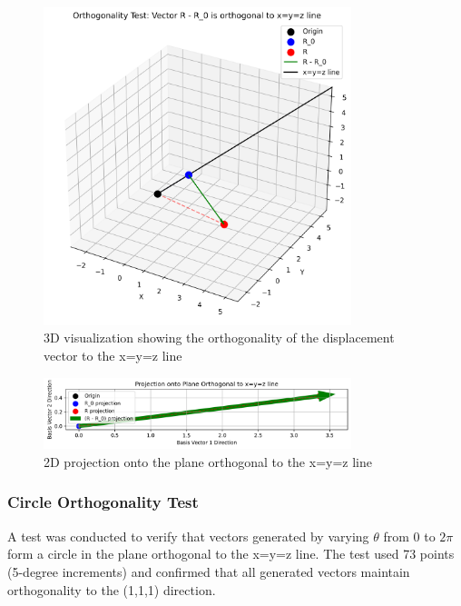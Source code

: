 \begin{figure}[H]
    \centering
    \includegraphics[width=0.8\textwidth]{figures/orthogonality_test/orthogonality_test_3d.png}
    \caption{3D visualization showing the orthogonality of the displacement vector to the x=y=z line}
    \label{fig:orthogonality_test_3d}
\end{figure}

\begin{figure}[H]
    \centering
    \includegraphics[width=0.8\textwidth]{figures/orthogonality_test/orthogonality_test_2d.png}
    \caption{2D projection onto the plane orthogonal to the x=y=z line}
    \label{fig:orthogonality_test_2d}
\end{figure}

\subsubsection{Circle Orthogonality Test}

A test was conducted to verify that vectors generated by varying $\theta$ from 0 to $2\pi$ form a circle in the plane orthogonal to the x=y=z line. The test used 73 points (5-degree increments) and confirmed that all generated vectors maintain orthogonality to the (1,1,1) direction.

